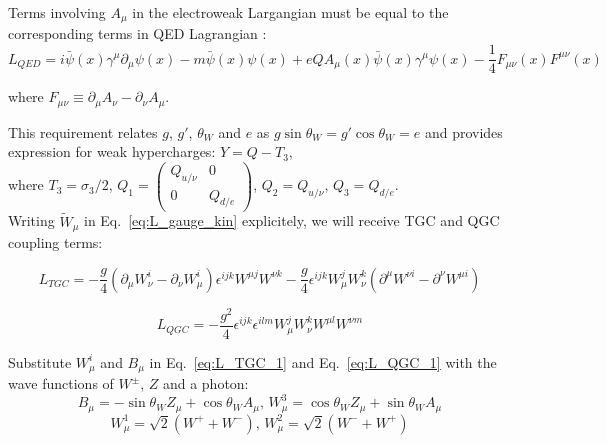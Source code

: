 Terms involving $A_\mu$ in the electroweak Largangian must be equal to the corresponding terms in QED Lagrangian \cite{ref_Pich}:\\

\begin{equation}\label{eq:L_QED}
L_{QED} = i \bar{\psi}(x) \gamma^\mu \partial_\mu \psi(x) - m \bar{\psi}(x) \psi(x) + e Q A_\mu(x) \bar{\psi}(x) \gamma^\mu \psi(x) - \frac{1}{4} F_{\mu\nu}(x) F^{\mu\nu}(x)
\end{equation}

where $F_{\mu\nu} \equiv \partial_\mu A_\nu - \partial_\nu A_\mu$.

This requirement relates $g$, $g'$, $\theta_W$ and $e$ as $g \sin \theta_W = g' \cos \theta_W = e$ and provides expression for weak hypercharges: $Y = Q - T_3$,\\

where $T_3 = \sigma_3 / 2$, $Q_1 = \begin{pmatrix} Q_{u/\nu} & 0 \\ 0 & Q_{d/e} \end{pmatrix}$, $Q_2 = Q_{u/\nu}$, $Q_3=Q_{d/e}$.\\

Writing $\tilde{W}_\mu$ in Eq.~\ref{eq:L_gauge_kin} explicitely, we will receive TGC and QGC coupling terms: 

\begin{equation} \label{eq:L_TGC_1}
L_{TGC} = -\frac{g}{4}(\partial_\mu W_\nu^i - \partial_\nu W_\mu^i)\epsilon^{ijk}W^{\mu j}W^{\nu k} - \frac{g}{4}\epsilon^{ijk}W_\mu^j W_\nu^k (\partial^\mu W^{\nu i} - \partial^\nu W^{\mu i})
\end{equation}

\begin{equation} \label{eq:L_QGC_1}
L_{QGC} = -\frac{g^2}{4} \epsilon^{ijk} \epsilon^{ilm} W_\mu^j W_\nu^k W^{\mu l} W^{\nu m}
\end{equation}

Substitute $W_\mu^i$ and $B_\mu$ in Eq.~\ref{eq:L_TGC_1} and Eq.~\ref{eq:L_QGC_1} with the wave functions of $W^\pm$, $Z$ and a photon:\\

\begin{equation} \label{eq:EWK_Zg_bosons_mixing}
B_\mu = -\sin \theta_W Z_\mu + \cos \theta_W A_\mu \text{, } W_\mu^3 = \cos \theta_W Z_\mu + \sin \theta_W A_\mu
\end{equation}
\begin{equation} \label{eq:EWK_Zg_bosons_mixing}
W_\mu^1 = \sqrt{2}(W^+ + W^-) \text{, }W_\mu^2 = \sqrt{2}(W^- + W^+)
\end{equation}

